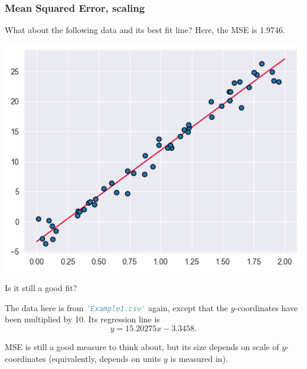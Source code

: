 \documentclass{beamer}
\theoremstyle{example}
\newcommand{\ct}[1]{\lstinline[language=Python]!#1!}
\begin{document}
\begin{frame}
    \frametitle{Mean Squared Error, scaling}
    What about the following data and its best fit line? Here, the MSE is 1.9746.
    
    \begin{center}
    \includegraphics[height=0.35\textheight]{../../Images/example1-lsr-scaled.png}    
    \end{center}
    
    Is it still a good fit? 

    \pause
    The data here is from \ct{'Example1.csv'} again, except that the $y$-coordinates have been multiplied by 10. Its regression line is 
        \[y = 15.20275x - 3.3458.\]
    
    \pause 
    MSE is still a good measure to think about, but its size depends on scale of $y$-coordinates (equivalently, depends on units $y$ is measured in).

\end{frame}
\end{document}
